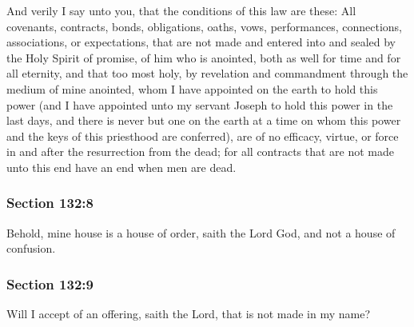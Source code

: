 		And verily I say unto you, that the conditions of this law are these: All covenants, contracts, bonds, obligations, oaths, vows, performances, connections, associations, or expectations, that are not made and entered into and sealed by the Holy Spirit of promise, of him who is anointed, both as well for time and for all eternity, and that too most holy, by revelation and commandment through the medium of mine anointed, whom I have appointed on the earth to hold this power (and I have appointed unto my servant Joseph to hold this power in the last days, and there is never but one on the earth at a time on whom this power and the keys of this priesthood are conferred), are of no efficacy, virtue, or force in and after the resurrection from the dead; for all contracts that are not made unto this end have an end when men are dead.
		

	\subsubsection{Section 132:8} %
		\label{DC132-8}

		Behold, mine house is a house of order, saith the Lord God, and not a house of confusion.


	\subsubsection{Section 132:9} %
		\label{DC132-9}

		Will I accept of an offering, saith the Lord, that is not made in my name?

